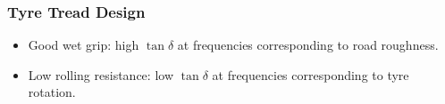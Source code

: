 \documentclass{NoteThesis/note-thesis}
\begin{document}
\subsubsection*{Tyre Tread Design}

\begin{itemize}
    \item Good wet grip: high $\tan\delta$ at frequencies corresponding to road roughness.
    \item Low rolling resistance: low $\tan\delta$ at frequencies corresponding to tyre rotation.
\end{itemize}
\end{document}
